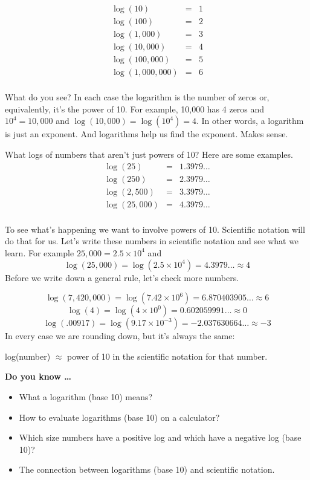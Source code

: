 \begin{eqnarray*}
\log (10) & = & 1 \\
\log (100) & = & 2 \\
\log (1,000) & = & 3 \\
\log (10,000) & = & 4 \\
\log (100,000) & = & 5 \\
\log (1,000,000) & = & 6 \\
\end{eqnarray*}
\vspace{-.5in} %

What do you see?  In each case the logarithm is the number of zeros or, equivalently, it's the power of 10.  For example, 10,000 has 4 zeros and $10^4= 10,000$ and $\log(10,000) = \log(10^4)=4$. In other words, a logarithm is just an exponent. And logarithms help us find the exponent.  Makes sense.

What logs of numbers that aren't just powers of 10? Here are some examples.
\begin{eqnarray*}
\log (25) & = & 1.3979\ldots \\
\log (250) & = & 2.3979\ldots \\
\log (2,500) & = & 3.3979\ldots \\
\log (25,000) & = & 4.3979\ldots \\
\end{eqnarray*}
\vspace{-.5in} %

To see what's happening we want to involve powers of 10.  Scientific notation will do that for us.  Let's write these numbers in scientific notation and see what we learn.  For example $ 25,000 = 2.5 \times 10^4$ and 
$$ \log( 25,000)=\log(2.5 \times 10 ^4)=4.3979\ldots \approx 4$$
Before we write down a general rule, let's check more numbers.

$$\log(7,420,000) = \log(7.42 \times 10^6)=6.870403905\ldots \approx 6$$ 
$$\log (4)=\log(4 \times 10^0)=0.602059991\ldots \approx 0$$ 
$$\log (.00917)= \log(9.17 \times 10^{-3}) = -2.037630664\ldots \approx -3$$
In every case we are rounding down, but it's always the same:

\begin{center}
log(number) $\approx$ power of 10 in the scientific notation for that number.
\end{center}

\noindent \textbf{Do you know \ldots}

\begin{itemize}
\item What a logarithm (base 10) means? 
\item How to evaluate logarithms (base 10) on a calculator? 
\item Which size numbers have a positive log and which have a negative log (base 10)?
\item The connection between logarithms (base 10) and scientific notation.

\end{itemize}


